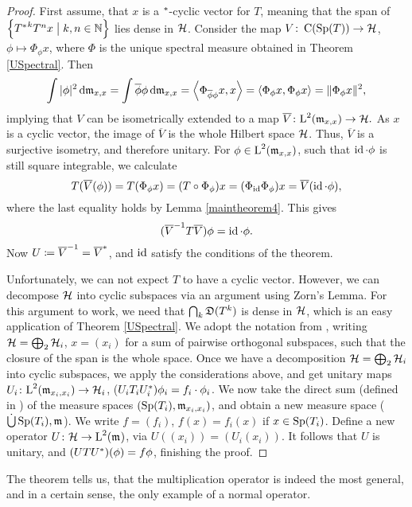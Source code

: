 \begin{proof}
 
 

First assume, that $x$ is a $^{*}$-cyclic vector for $T$, meaning that 
the span of $\left\lbrace {T^{*}} ^k T^n x\bigm | k,n \in \mathbb{N} \right\rbrace$ lies dense in $\mathcal{H}$. 
Consider the map $V\colon\operatorname{C}(\operatorname{Sp}(T)) \to \mathcal{H}$, 
$\phi \mapsto \Phi_\phi x$, where $\Phi$ is the unique spectral 
measure obtained in Theorem \ref{USpectral}. Then
\begin{gather*}
 \int |\phi|^2 \operatorname{d}\! \mathfrak{m}_{x,x} = \int \overline{\phi}\phi \operatorname{d}\! \mathfrak{m}_{x,x}
 = \left\langle \Phi_{\overline{\phi} \phi} x, x \right\rangle= \left\langle \Phi_\phi x, \Phi_\phi x \right\rangle 
 = \|\Phi_\phi x \|^2,
\end{gather*}
implying that $V$ can be isometrically extended to a map 
$\overline{V}\colon \text{L}^2(\mathfrak{m}_{x,x}) \to \mathcal{H}.$ As $x$ is a cyclic vector, 
the image of $\overline{V}$ is the whole Hilbert space $\mathcal{H}$. Thus, 
$\overline{V}$ is a surjective isometry, and therefore unitary. For
$\phi \in \text{L}^2(\mathfrak{m}_{x,x})$, such that $\operatorname{id} \cdot \phi$ is still 
square integrable, we calculate
\[
 T(\overline{V}(\phi))= T(\Phi_\phi x) = (T\circ \Phi_\phi)x = (\Phi_{\operatorname{id}} \Phi_\phi) x
 = \overline{V}(\operatorname{id} \cdot \phi),
\]
where the last equality holds by Lemma \ref{maintheorem4}. This gives
\[
 (\overline{V}^{-1} T \overline{V})\phi = \operatorname{id} \cdot \phi.
\]
Now $U\coloneqq  \overline{V}^{-1} = \overline{V}^{*}$, and $\operatorname{id}$ satisfy 
the conditions of the theorem.

Unfortunately, we can not expect $T$ to have a cyclic vector. However, we can 
decompose $\mathcal{H}$ into cyclic subspaces via an argument using Zorn's Lemma.
For this argument to work, we need that $\bigcap_k \mathfrak{D}(T^k)$ is dense in $\mathcal{H}$,
which is an easy application of Theorem \ref{USpectral}.
We adopt the notation from \cite[pp. 337]{WernerFunkAna}, writing
$\mathcal{H} = \bigoplus_2 \mathcal{H}_i$, $x = (x_i)$ for a sum of pairwise orthogonal subspaces, such that
the closure of the span is the whole space. Once we have a decomposition
$\mathcal{H} = \bigoplus_2 \mathcal{H}_i$ into cyclic subspaces, we apply the 
considerations above, and get
unitary maps $U_i \colon \text{L}^2(\mathfrak{m}_{x_i, x_i}) \to \mathcal{H}_i$, 
($U_i T_i U_i ^{*})\phi_i = f_i \cdot \phi_i$. We now take the direct sum
(defined in \cite[214L]{FremMeasureTheo}) of the measure spaces $(\operatorname{Sp}(T_i), \mathfrak{m}_{x_i,x_i})$,
and obtain a new measure space ($\dot\bigcup \operatorname{Sp}(T_i),\mathfrak{m}_{}$).
We write $f = (f_i)$, $f(x) = f_i(x)$ if $x \in \operatorname{Sp}(T_i)$. 
Define a new operator $U\colon\mathcal{H} \to \text{L}^2(\mathfrak{m}_{})$, via 
$U((x_i)) = (U_i(x_i))$. It follows that $U$ is unitary, and 
$(UTU^{*})(\phi) = f\phi$, finishing the proof.
\end{proof}

The theorem tells us, that the multiplication operator is indeed 
the most general, and in a certain sense, the only example of a normal
operator.























